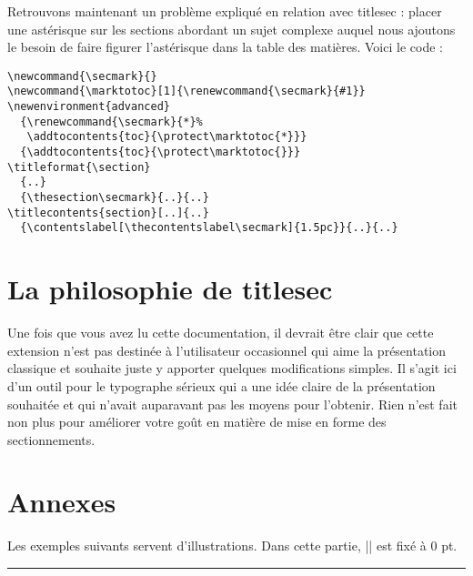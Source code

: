 \documentclass[a4paper]{ltxguide}
\newcommand{\examplesep}{%
  \begin{center}%
    \rule{4pt}{4pt}%
  \end{center}}
\begin{document}
Retrouvons maintenant un problème expliqué en relation avec \textsf{titlesec} : 
placer une astérisque sur les sections abordant un \og sujet complexe \fg{} auquel
nous ajoutons le besoin de faire figurer l'astérisque dans la table des matières. 
Voici le code :
\begin{verbatim}
\newcommand{\secmark}{}
\newcommand{\marktotoc}[1]{\renewcommand{\secmark}{#1}}
\newenvironment{advanced}
  {\renewcommand{\secmark}{*}%
   \addtocontents{toc}{\protect\marktotoc{*}}}
  {\addtocontents{toc}{\protect\marktotoc{}}}
\titleformat{\section}
  {..}
  {\thesection\secmark}{..}{..}
\titlecontents{section}[..]{..}
  {\contentslabel[\thecontentslabel\secmark]{1.5pc}}{..}{..}
\end{verbatim}

\section{La philosophie de \textsf{titlesec}}

Une fois que vous avez lu cette documentation, il devrait être clair que cette
extension n'est pas destinée à l'utilisateur occasionnel qui aime la présentation
classique et souhaite juste y apporter quelques modifications simples. Il s'agit ici
d'un outil pour le typographe sérieux qui a une idée claire de la présentation 
souhaitée et qui n'avait auparavant pas les moyens pour l'obtenir. Rien n'est fait non
plus pour améliorer votre goût en matière de mise en forme des sectionnements.


\section{Annexes}

Les exemples suivants servent d'illustrations. Dans cette partie, |\parskip| est
fixé à 0 pt.

\begingroup

\setlength{\parskip}{0pt}

\examplesep

\titleformat{\section}[block]
  {\normalfont\bfseries\filcenter}{\fbox{\itshape\thesection}}{1em}{}
\end{document}
